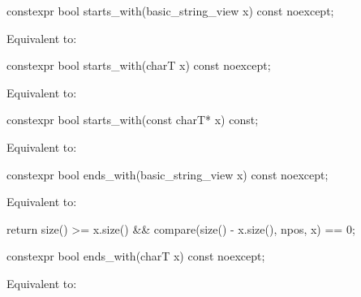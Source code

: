 %
\begin{itemdecl}
constexpr bool starts_with(basic_string_view x) const noexcept;
\end{itemdecl}

\begin{itemdescr}
\pnum
\effects
Equivalent to: 
\end{itemdescr}

%
\begin{itemdecl}
constexpr bool starts_with(charT x) const noexcept;
\end{itemdecl}

\begin{itemdescr}
\pnum
\effects
Equivalent to: 
\end{itemdescr}

%
\begin{itemdecl}
constexpr bool starts_with(const charT* x) const;
\end{itemdecl}

\begin{itemdescr}
\pnum
\effects
Equivalent to: 
\end{itemdescr}

%
\begin{itemdecl}
constexpr bool ends_with(basic_string_view x) const noexcept;
\end{itemdecl}

\begin{itemdescr}
\pnum
\effects
Equivalent to:
\begin{codeblock}
return size() >= x.size() && compare(size() - x.size(), npos, x) == 0;
\end{codeblock}
\end{itemdescr}

%
\begin{itemdecl}
constexpr bool ends_with(charT x) const noexcept;
\end{itemdecl}

\begin{itemdescr}
\pnum
\effects
Equivalent to: 
\end{itemdescr}

